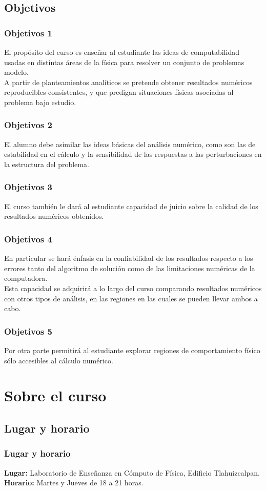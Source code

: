 \subsection{Objetivos}
\begin{frame}
\frametitle{Objetivos 1}
El propósito del curso es enseñar al estudiante las ideas de computabilidad usadas en distintas áreas de la  física para resolver un conjunto de problemas modelo. 
\\
\bigskip
\pause
A partir de planteamientos analíticos se pretende obtener resultados numéricos reproducibles consistentes, y que predigan situaciones físicas asociadas al problema bajo estudio.
\end{frame}
\begin{frame}
\frametitle{Objetivos 2}
El alumno debe asimilar las ideas básicas del análisis numérico, como son las de estabilidad en el cálculo y la sensibilidad de las respuestas a las perturbaciones en la estructura del problema.
\end{frame}
\begin{frame}
\frametitle{Objetivos 3}
El curso también le dará al estudiante capacidad de juicio sobre la calidad de los resultados numéricos obtenidos.
\end{frame}
\begin{frame}
\frametitle{Objetivos 4}
En particular se hará énfasis en la confiabilidad de los resultados respecto a los errores tanto del algoritmo de solución como de las limitaciones numéricas de la computadora. 
\\
\bigskip
\pause
Esta capacidad se adquirirá a lo largo del curso comparando resultados numéricos con otros tipos de análisis, en las regiones en las cuales se pueden llevar ambos a cabo.
\end{frame}
\begin{frame}
\frametitle{Objetivos 5}
 Por otra parte permitirá al estudiante explorar regiones de comportamiento físico sólo accesibles al cálculo numérico.
\end{frame}
\section{Sobre el curso}
\subsection{Lugar y horario}
\begin{frame}
\frametitle{Lugar y horario} 
\textbf{Lugar: }Laboratorio de Enseñanza en Cómputo de Física, Edificio Tlahuizcalpan.
\\
\bigskip
\textbf{Horario: } Martes y Jueves de 18 a 21 horas.
\end{frame}
